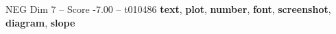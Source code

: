 \begin{textsample}{NEG Dim 7 – Score -7.00 – t010486}  \label{ex:f7_neg_021}
\textbf{text}, \textbf{plot}, \textbf{number}, \textbf{font}, \textbf{screenshot}, \textbf{diagram}, \textbf{slope}

\end{textsample}

